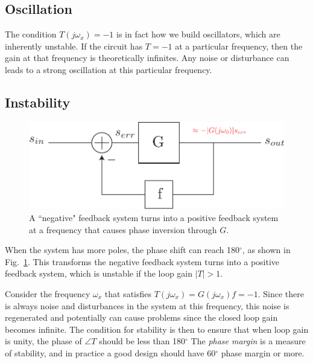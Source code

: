 \subsection{Oscillation}

The condition $T(j\omega_x) = -1$ is in fact how we build oscillators, which are inherently unstable. If the circuit has $T = -1$ at a particular frequency, then the gain at that frequency is theoretically infinites.  Any noise or disturbance can leads to a strong oscillation at this particular frequency.


\subsection{Instability}

\begin{figure}[tb]
\begin{center}
\includegraphics[scale=.7]{fbblock_phase}
\end{center}
\caption{A ``negative" feedback system turns into a positive feedback system at a frequency that causes phase inversion through $G$.} \label{fig:fbblock_phase}
\end{figure}

When the system has more poles, the phase shift can reach 180$^\circ$, as shown in Fig.~\ref{fig:fbblock_phase}. 
This transforms the negative feedback system turns into a positive feedback system, which is unstable if the loop gain $|T|>1$.  

Consider the frequency $\omega_x$ that satisfies $ T(j\omega_x) = G(j{\omega _x})f =  - 1$. Since there is always noise and disturbances in the system at this frequency, this noise is regenerated and potentially can cause problems since the closed loop gain becomes infinite. The condition for stability is then to ensure that when loop gain is unity, the phase of $\angle T$ should be less than 180$^\circ$  The \textit{phase margin} is a measure of stability, and in practice a good design should have 60$^\circ$ phase margin or more.
 





